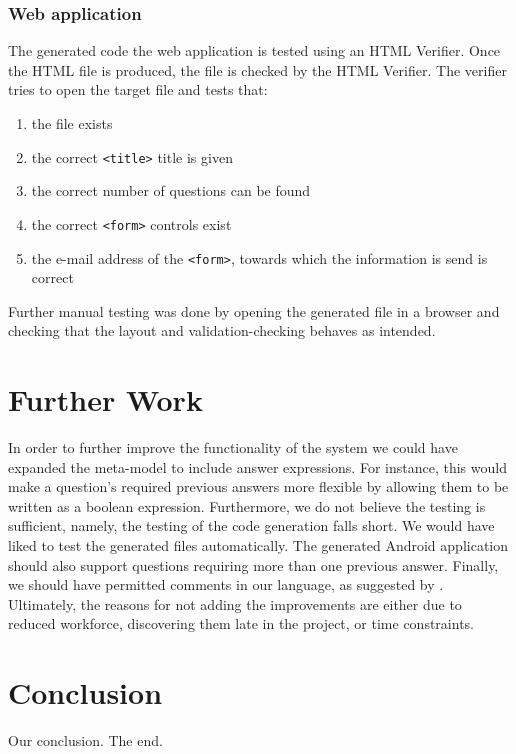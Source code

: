 \documentclass[runningheads]{llncs}
\begin{document}
\subsubsection{Web application}
The generated code the web application is tested using an HTML Verifier. Once the HTML file is produced, the file is checked by the HTML Verifier. The verifier tries to open the target file and tests that:
\begin{enumerate}
\item the file exists
\item the correct \texttt{<title>} title is given
\item the correct number of questions can be found
\item the correct \texttt{<form>} controls exist
\item the e-mail address of the \texttt{<form>}, towards which the information is send is correct
\end{enumerate}
Further manual testing was done by opening the generated file in a browser and checking that the layout and validation-checking behaves as intended.

\section{Further Work}
In order to further improve the functionality of the system we could have expanded the meta-model to include answer expressions. For instance, this would make a question's required previous answers more flexible by allowing them to be written as a boolean expression. Furthermore, we do not believe the testing is sufficient, namely, the testing of the code generation falls short. We would have liked to test the generated files automatically. The generated Android application should also support questions requiring more than one previous answer. Finally, we should have permitted comments in our language, as suggested by \cite{karsai}. Ultimately, the reasons for not adding the improvements are either due to reduced workforce, discovering them late in the project, or time constraints.

\section{Conclusion}
Our conclusion. The end.
\end{document}
